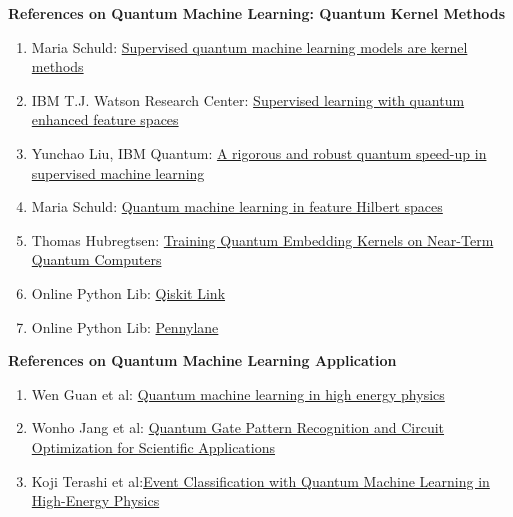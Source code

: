 \textbf{References on Quantum Machine Learning: Quantum Kernel Methods}
\begin{enumerate}
  \item Maria Schuld: \href{https://arxiv.org/abs/2101.11020}{Supervised quantum machine learning models are kernel methods}
  \item IBM T.J. Watson Research Center: \href{https://arxiv.org/abs/1804.11326}{Supervised learning with quantum enhanced feature spaces}
  \item Yunchao Liu, IBM Quantum: \href{https://arxiv.org/abs/2010.02174}{A rigorous and robust quantum speed-up in supervised machine learning}
  \item Maria Schuld: \href{https://arxiv.org/abs/1803.07128}{Quantum machine learning in feature Hilbert spaces}
  \item Thomas Hubregtsen: \href{https://arxiv.org/abs/2105.02276}{Training Quantum Embedding Kernels on Near-Term Quantum Computers}
  \item Online Python Lib: \href{https://qiskit.org/documentation/machine-learning/tutorials/03_quantum_kernel.html
  }{Qiskit Link}
  \item Online Python Lib: \href{https://pennylane.ai/qml/demos/tutorial_kernel_based_training.html}{Pennylane}
\end{enumerate}

\textbf{References on Quantum Machine Learning Application}
\begin{enumerate}
  \item Wen Guan et al: \href{https://iopscience.iop.org/article/10.1088/2632-2153/abc17d}{
    Quantum machine learning in high energy physics}
  \item Wonho Jang et al: \href{https://arxiv.org/abs/2102.10008}{
    Quantum Gate Pattern Recognition and Circuit Optimization for Scientific Applications}
  \item Koji Terashi et al:\href{https://link.springer.com/article/10.1007/s41781-020-00047-7}{Event Classification 
  with Quantum Machine Learning in High-Energy Physics }
\end{enumerate}

